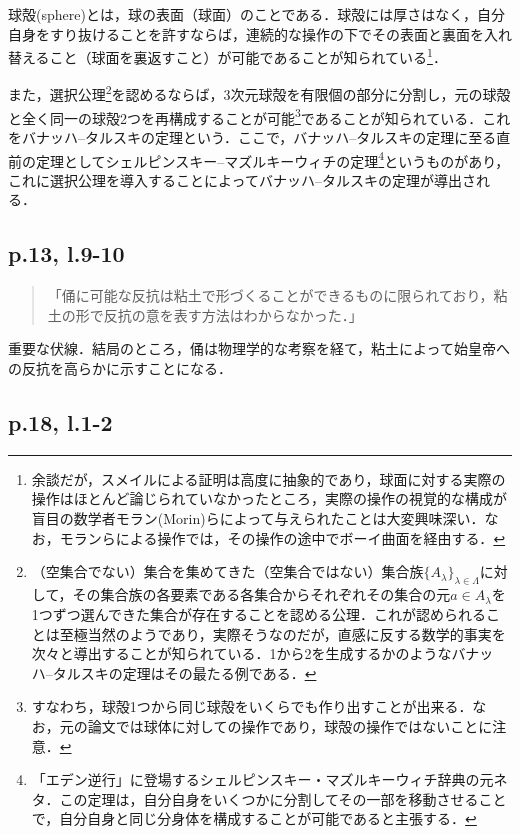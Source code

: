 \documentclass[10pt, a5paper, twoside]{jsarticle}
\theoremstyle{definition}
\begin{document}
		球殻(sphere)とは，球の表面（球面）のことである．球殻には厚さはなく，自分自身をすり抜けることを許すならば，連続的な操作の下でその表面と裏面を入れ替えること（球面を裏返すこと）が可能であることが知られている\cite{smale}\footnote{余談だが，スメイルによる証明\cite{smale}は高度に抽象的であり，球面に対する実際の操作はほとんど論じられていなかったところ，実際の操作の視覚的な構成が盲目の数学者モラン(Morin)らによって与えられたことは大変興味深い．なお，モランらによる操作では，その操作の途中でボーイ曲面を経由する．}．

		また，選択公理\footnote{（空集合でない）集合を集めてきた（空集合ではない）集合族$ { \{ A_{\lambda} \} }_{\lambda \in \Lambda}$に対して，その集合族の各要素である各集合からそれぞれその集合の元$ a \in A_\lambda $を1つずつ選んできた集合が存在することを認める公理\cite{hara}．これが認められることは至極当然のようであり，実際そうなのだが，直感に反する数学的事実を次々と導出することが知られている．1から2を生成するかのようなバナッハ--タルスキの定理はその最たる例である．}を認めるならば，3次元球殻を有限個の部分に分割し，元の球殻と全く同一の球殻2つを再構成することが可能\footnote{すなわち，球殻1つから同じ球殻をいくらでも作り出すことが出来る．なお，元の論文\cite{bantar}では球体に対しての操作であり，球殻の操作ではないことに注意．}であることが知られている．これをバナッハ--タルスキの定理という．ここで，バナッハ--タルスキの定理に至る直前の定理としてシェルピンスキー--マズルキーウィチの定理\footnote{「エデン逆行」に登場するシェルピンスキー・マズルキーウィチ辞典の元ネタ．この定理は，自分自身をいくつかに分割してその一部を移動させることで，自分自身と同じ分身体を構成することが可能であると主張する．}というものがあり，これに選択公理を導入することによってバナッハ--タルスキの定理が導出される\cite{math}．

		\subsection{p.13, l.9-10}\label{eisei1}

		\begin{quote}

			「俑に可能な反抗は粘土で形づくることができるものに限られており，粘土の形で反抗の意を表す方法はわからなかった．」

		\end{quote}

		重要な伏線．結局のところ，俑は物理学的な考察を経て，粘土によって始皇帝への反抗を高らかに示すことになる．

		\subsection{p.18, l.1-2}
\end{document}
